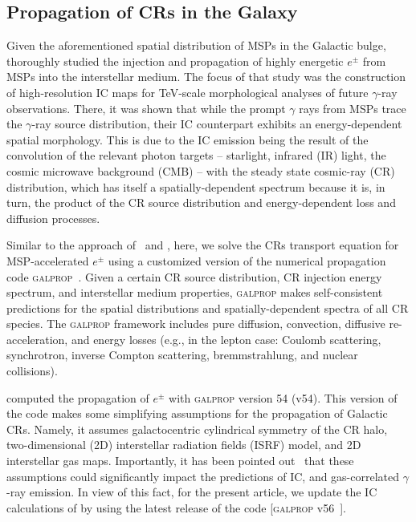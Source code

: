 \documentclass[doublespace,draft,nopageskip]{VTthesis} %
\begin{document}
\subsection{Propagation of CRs in the Galaxy}
\label{subsec:propagation}

Given the aforementioned spatial distribution of MSPs in the Galactic bulge, \cite{Song:2019nrx} thoroughly studied the injection and propagation of highly energetic $e^{\pm}$ from MSPs into the interstellar medium. The focus of that study was the construction of high-resolution IC maps for TeV-scale morphological analyses of future $\gamma$-ray observations. There, it was shown that while the prompt $\gamma$ rays from MSPs trace the $\gamma$-ray source distribution, their IC counterpart exhibits an energy-dependent spatial morphology. This is due to the IC emission being the result of 
the convolution of the relevant photon targets -- starlight, infrared (IR) light, the cosmic microwave background (CMB) -- with the
steady state cosmic-ray (CR) distribution, which has itself 
a spatially-dependent spectrum because it is, in turn, the product of the CR source distribution and energy-dependent loss and diffusion processes.


Similar to the approach of~\citet{Song:2019nrx} and \citet{Ishiwata:2019aet}, here, we solve the CRs transport equation for MSP-accelerated $e^{\pm}$ using a customized version of the numerical propagation code \textsc{galprop}~\citep{Porter:2006tb,Strong:2007nh}. Given a certain CR source distribution, CR injection energy spectrum, and interstellar medium properties, \textsc{galprop} makes self-consistent predictions  
for the spatial distributions and spatially-dependent spectra of
 all CR species. The \textsc{galprop} framework includes pure diffusion, convection, diffusive re-acceleration, and energy losses (e.g., in the lepton case: Coulomb scattering, synchrotron, inverse Compton scattering, bremmstrahlung,  and nuclear collisions). 


\citet{Song:2019nrx} computed the propagation of $e^{\pm}$ with \textsc{galprop} version 54 (v54). This version of the code makes some simplifying assumptions for the propagation of Galactic CRs. Namely, it  assumes galactocentric cylindrical symmetry of the CR halo, two-dimensional (2D) interstellar radiation fields (ISRF) model, and 2D interstellar gas maps. Importantly, it has been pointed out~\citep{Porter:2017vaa,Johannesson:2018bit} that these assumptions could significantly impact the predictions of IC, and gas-correlated $\gamma$-ray emission. In view of this fact, for the present article, we update the IC calculations of \citet{Song:2019nrx} by using the latest release of the code [\textsc{galprop} v56~\citep{Porter:2017vaa,Johannesson:2018bit}].    
\end{document}
